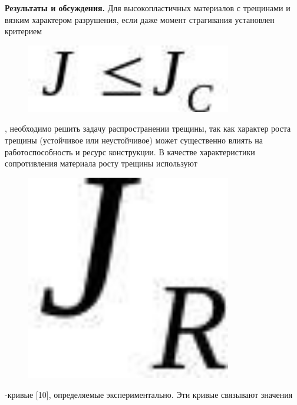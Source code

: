 {\bfseries Результаты и обсуждения.} Для высокопластичных материалов с
трещинами и вязким характером разрушения, если даже момент страгивания
установлен критерием \begin{figure}[H]
	\centering
	\includegraphics[width=0.8\textwidth]{assets/1195}
	\caption*{}
\end{figure}, необходимо
решить задачу распространении трещины, так как характер роста трещины
(устойчивое или неустойчивое) может существенно влиять на
работоспособность и ресурс конструкции. В качестве характеристики
сопротивления материала росту трещины используют
\begin{figure}[H]
	\centering
	\includegraphics[width=0.8\textwidth]{assets/1196}
	\caption*{}
\end{figure}-кривые {[}10{]}, определяемые
экспериментально. Эти кривые связывают значения
